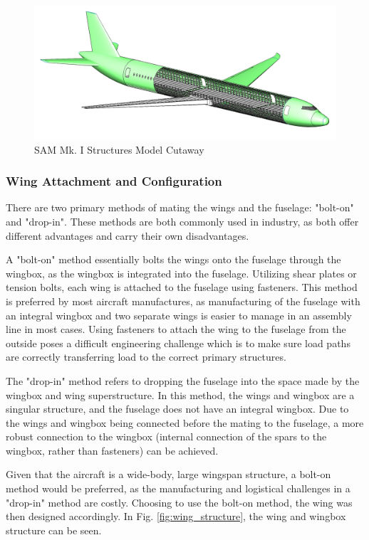 \begin{figure}[!h]
    \centering
    \includegraphics[width=\linewidth]{Photos/structuresandloads/Updated Sctructures Cutaway.PNG}
    \caption{SAM Mk. I Structures Model Cutaway}
    \label{fig:structure_cutaway}
\end{figure}

\subsubsection{Wing Attachment and Configuration}
There are two primary methods of mating the wings and the fuselage: "bolt-on" and "drop-in". These methods are both commonly used in industry, as both offer different advantages and carry their own disadvantages. 

A "bolt-on" method essentially bolts the wings onto the fuselage through the wingbox, as the wingbox is integrated into the fuselage. Utilizing shear plates or tension bolts, each wing is attached to the fuselage using fasteners. This method is preferred by most aircraft manufactures, as manufacturing of the fuselage with an integral wingbox and two separate wings is easier to manage in an assembly line in most cases. Using fasteners to attach the wing to the fuselage from the outside poses a difficult engineering challenge which is to make sure load paths are correctly transferring load to the correct primary structures.

The "drop-in" method refers to dropping the fuselage into the space made by the wingbox and wing superstructure. In this method, the wings and wingbox are a singular structure, and the fuselage does not have an integral wingbox. Due to the wings and wingbox being connected before the mating to the fuselage, a more robust connection to the wingbox (internal connection of the spars to the wingbox, rather than fasteners) can be achieved. 

Given that the aircraft is a wide-body, large wingspan structure, a bolt-on method would be preferred, as the manufacturing and logistical challenges in a "drop-in" method are costly. Choosing to use the bolt-on method, the wing was then designed accordingly. In Fig. \ref{fig:wing_structure}, the wing and wingbox structure can be seen.

